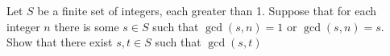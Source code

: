 Let $S$ be a finite set of integers, each greater than 1.  Suppose that
for each integer $n$ there is some $s\in S$ such that $\gcd(s,n)=1$ or
$\gcd(s,n)=s$.  Show that there exist $s,t\in S$ such that $\gcd(s,t)$
